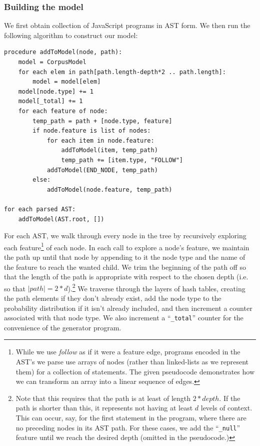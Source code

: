 \documentclass[titlepage]{article}
\begin{document}
\subsubsection{Building the model}

We first obtain collection of JavaScript programs in AST form. We then run the following algorithm to construct our model:

\begin{verbatim}
procedure addToModel(node, path):
    model = CorpusModel
    for each elem in path[path.length-depth*2 .. path.length]:
        model = model[elem]
    model[node.type] += 1
    model[_total] += 1
    for each feature of node:
        temp_path = path + [node.type, feature]
        if node.feature is list of nodes:
            for each item in node.feature:
                addToModel(item, temp_path)
                temp_path += [item.type, "FOLLOW"]
            addToModel(END_NODE, temp_path)
        else:
            addToModel(node.feature, temp_path)

for each parsed AST:
    addToModel(AST.root, [])
\end{verbatim}

For each AST, we walk through every node in the tree by recursively exploring each feature\footnote{While we use \emph{follow} as if it were a feature edge, programs encoded in the AST's we parse use arrays of nodes (rather than linked-lists as we represent them) for a collection of statements. The given pseudocode demonstrates how we can transform an array into a linear sequence of edges.} of each node. In each call to explore a node's feature, we maintain the path up until that node by appending to it the node type and the name of the feature to reach the wanted child. We trim the beginning of the path off so that the length of the path is appropriate with respect to the chosen depth (i.e. so that $|path| = 2*d$).\footnote{Note that this requires that the path is at least of length $2*depth$. If the path is shorter than this, it represents not having at least $d$ levels of context. This can occur, say, for the first statement in the program, where there are no preceding nodes in its AST path. For these cases, we add the ``{\tt \_null}'' feature until we reach the desired depth (omitted in the pseudocode.)} We traverse through the layers of hash tables, creating the path elements if they don't already exist, add the node type to the probability distribution if it isn't already included, and then increment a counter associated with that node type. We also increment a ``{\tt \_total}'' counter for the convenience of the generator program.
\end{document}
